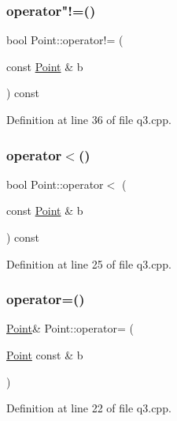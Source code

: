 \subsubsection{\texorpdfstring{operator"!=()}{operator!=()}}
{\footnotesize\ttfamily bool Point\+::operator!= (\begin{DoxyParamCaption}\item[{const \hyperlink{struct_point}{Point} \&}]{b }\end{DoxyParamCaption}) const\hspace{0.3cm}{\ttfamily [inline]}}



Definition at line 36 of file q3.\+cpp.

\mbox{\label{struct_point_ad7e2bd4ef0f76e601a88b319a9197de1}} 
\subsubsection{\texorpdfstring{operator$<$()}{operator<()}}
{\footnotesize\ttfamily bool Point\+::operator$<$ (\begin{DoxyParamCaption}\item[{const \hyperlink{struct_point}{Point} \&}]{b }\end{DoxyParamCaption}) const\hspace{0.3cm}{\ttfamily [inline]}}



Definition at line 25 of file q3.\+cpp.

\mbox{\label{struct_point_a747f1de8a657c95d9afc2976ef47829b}} 
\subsubsection{\texorpdfstring{operator=()}{operator=()}}
{\footnotesize\ttfamily \hyperlink{struct_point}{Point}\& Point\+::operator= (\begin{DoxyParamCaption}\item[{\hyperlink{struct_point}{Point} const \&}]{b }\end{DoxyParamCaption})\hspace{0.3cm}{\ttfamily [inline]}}



Definition at line 22 of file q3.\+cpp.


